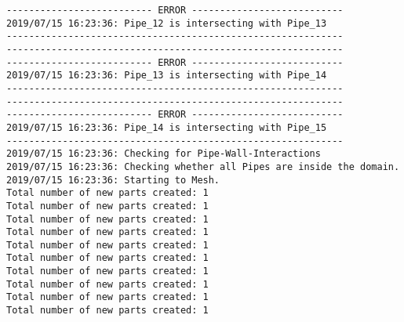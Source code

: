 \documentclass{article}
\begin{document}
{\begin{verbatim}
-------------------------- ERROR ---------------------------
2019/07/15 16:23:36: Pipe_12 is intersecting with Pipe_13
------------------------------------------------------------
------------------------------------------------------------
-------------------------- ERROR ---------------------------
2019/07/15 16:23:36: Pipe_13 is intersecting with Pipe_14
------------------------------------------------------------
------------------------------------------------------------
-------------------------- ERROR ---------------------------
2019/07/15 16:23:36: Pipe_14 is intersecting with Pipe_15
------------------------------------------------------------
2019/07/15 16:23:36: Checking for Pipe-Wall-Interactions
2019/07/15 16:23:36: Checking whether all Pipes are inside the domain.
2019/07/15 16:23:36: Starting to Mesh.
Total number of new parts created: 1
Total number of new parts created: 1
Total number of new parts created: 1
Total number of new parts created: 1
Total number of new parts created: 1
Total number of new parts created: 1
Total number of new parts created: 1
Total number of new parts created: 1
Total number of new parts created: 1
Total number of new parts created: 1
\end{verbatim}
}
\clearpage
\end{document}
